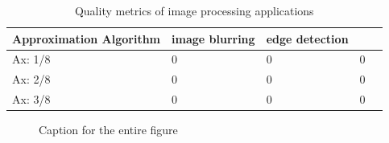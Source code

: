 \documentclass[]{IEEEconf}
\begin{document}
\begin{table}[h]
\caption{Quality metrics of image processing applications}
\begin{tabular}{|l|l|l|l|l|}
\hline
Approximation Algorithm & image blurring & edge detection \\ \hline
Ax: 1/8 & 0 & 0 & 0 \\ \hline
Ax: 2/8 & 0 & 0 & 0 \\ \hline
Ax: 3/8 & 0 & 0 & 0 \\ \hline
\end{tabular}
\end{table}



\begin{figure}[!htb]
    \centering
    \hfill
    \hfill
    \caption{Caption for the entire figure}
    \label{fig:whole}
\end{figure}%



		 


\end{document}
